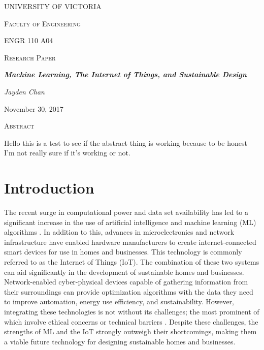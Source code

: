 \documentclass[letterpaper]{article}
\begin{document}
\begin{titlepage}
    \centering
    {\scshape\huge UNIVERSITY OF VICTORIA\par}
    \vspace{1cm}
    {\scshape\LARGE Faculty of Engineering\par\Large ENGR 110 A04\par}
    \vspace{1cm}
    {\scshape\Large Research Paper\par}
    \vspace{1.5cm}
    {\huge\bfseries \emph{Machine Learning, The Internet of Things, and Sustainable Design}\par}
    \vspace{2cm}
    {\Large\itshape Jayden Chan\par}
    \vfill
    {\large November 30, 2017\par}
\end{titlepage}

\pagestyle{customPage}

\begin{center}
\begin{minipage}{9.5cm}\setlength{\parindent}{5ex}
    \begin{center}
        {\scshape{Abstract}}
    \end{center}
    \vspace{-0.25cm}
    \hspace{4ex}
    Hello this is a test to see if the abstract thing is working because to be honest I'm not really sure if it's working or not.
\end{minipage}
\end{center}

\section{Introduction} \label{intro}
The recent surge in computational power and data set availability has led to a significant increase in the use of artificial intelligence and machine learning (ML) algorithms \cite{chan17}. In addition to this, advances in microelectronics and network infrastructure have enabled hardware manufacturers to create internet-connected smart devices for use in homes and businesses. This technology is commonly referred to as the Internet of Things (IoT). The combination of these two systems can aid significantly in the development of sustainable homes and businesses. Network-enabled cyber-physical devices capable of gathering information from their surroundings can provide optimization algorithms with the data they need to improve automation, energy use efficiency, and sustainability. However, integrating these technologies is not without its challenges; the most prominent of which involve ethical concerns or technical barriers \cite{perisic16, mccalman17, vlacheas13}. Despite these challenges, the strengths of ML and the IoT strongly outweigh their shortcomings, making them a viable future technology for designing sustainable homes and businesses.
\end{document}
